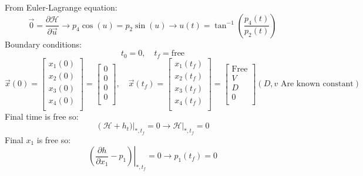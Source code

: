 From Euler-Lagrange equation:
$$
{\vec{0}} = \dfrac{\partial \mathcal{H} }{\partial \vec{u}} \to 
p_4\cos(u) = p_2\sin(u) \to u(t) = \tan^{-1}\left(\dfrac{p_4(t)}{p_2(t)}\right)
$$
Boundary conditions:
$$t_0 = 0,\quad t_f = \text{free}$$
$$\vec{x}(0) = \begin{bmatrix}
	x_1(0) \\
	x_2(0) \\
	x_3(0) \\
	x_4(0) \\
\end{bmatrix}= \begin{bmatrix}
	0 \\
	0 \\
	0 \\
	0 \\
\end{bmatrix}, \quad
\vec{x}(t_f) = \begin{bmatrix}
	x_1(t_f) \\
	x_2(t_f) \\
	x_3(t_f) \\
	x_4(t_f) \\
\end{bmatrix}= \begin{bmatrix}
	\text{Free} \\
	V \\
	D \\
	0 \\
\end{bmatrix}
(D, v \text{ Are known constant})$$
Final time is free so:
$$\left(\mathcal{H} + h_t)\right \vert_{*, t_f} = 0 \to \mathcal{H} \vert_{*, t_f} = 0 $$
Final $x_1$ is free so:
\begin{equation}\label{Solvep_1Q2_a}
	\left.(\dfrac{\partial h}{\partial x_1} - p_1) \right \vert_{*, t_f} = 0 \to p_1(t_f) = 0
\end{equation}

